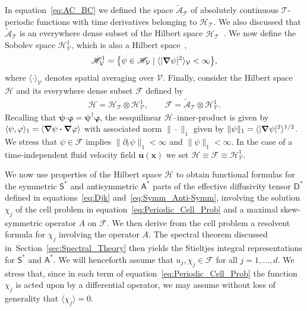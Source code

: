 \documentclass[leqno,onefignum,onetabnum]{siamltex1213}
\newcommand{\secref}[1]{Section~\ref{#1}}
\newcommand{\Tc}{\mathcal{T}}
\newcommand{\Vc}{\mathcal{V}}
\newcommand{\Dm}{\mathsf{D}}
\newcommand{\Sm}{\mathsf{S}}
\newcommand{\Am}{\mathsf{A}}
\newcommand{\Hs}{\mathscr{H}}
\newcommand{\As}{\mathscr{A}}
\newcommand{\Fs}{\mathscr{F}}
\newcommand\bnabla{\mbox{\boldmath${\nabla}$}}
\providecommand\bcdot{\boldsymbol{\cdot}}
\newcommand{\vecx}{\boldsymbol{x}}
\newcommand{\vecu}{\boldsymbol{u}}
\newcommand{\vecpsi}{\boldsymbol{\psi}}
\newcommand{\vecvarphi}{\boldsymbol{\varphi}}
\begin{document}
In equation~\eqref{eq:AC_BC} we defined the space $\tilde{\As}_{\Tc}$ of
absolutely continuous $\Tc$-periodic functions with time derivatives
belonging to $\Hs_{\Tc}$. We also discussed that $\tilde{\As}_{\Tc}$
is an everywhere dense subset of 
the Hilbert space $\Hs_{\Tc}$~\cite{Stone:64}. We now define the Sobolev
space $\Hs^1_{\Vc}$, which is also a Hilbert
space~\cite{Bhattacharya:AAP:1999:951,Folland:95:PDEs,McOwen:2003:PDE},            
% 
\begin{align}\label{eq:Sobolev}
  \Hs^1_{\Vc}=\big\{\psi\in \Hs_{\Vc} \; | \; \langle|\bnabla \psi|^2\rangle_{\Vc}<\infty\big\}, 
\end{align}
%
where $\langle\cdot\rangle_{\Vc}$ 
denotes spatial averaging over $\Vc$.  Finally, consider the Hilbert
space $\Hs$ and its everywhere dense subset $\Fs$ defined by
%
\begin{align}\label{eq:Function_Space_Scalar}
  \Hs=\Hs_{\Tc}\otimes\Hs^1_{\Vc}, \qquad
  \Fs=\tilde{\As}_{\Tc}\otimes\Hs^1_{\Vc}.
\end{align}
%
Recalling that $\vecpsi\bcdot\vecvarphi=\vecpsi^\dagger\vecvarphi$, the sesquilinear
$\Hs$--inner-product is given by $\langle\psi,\varphi\rangle_1=\left\langle\bnabla \psi\bcdot\bnabla \varphi \right\rangle$ with associated norm
$\|\cdot\|_1$ given by $\|\psi\|_1= \langle|\bnabla \psi|^2\rangle^{1/2}$. We stress that $\psi\in\Fs$
implies $\|\partial_t\psi\|_1<\infty$ and $\|\psi\|_1<\infty$. In the case of a time-independent
fluid velocity field $\vecu(\vecx)$ we set $\Hs\equiv\Fs\equiv\Hs^1_{\Vc}$. 





We now use properties of the Hilbert space $\Hs$ to obtain
functional formulas for the symmetric $\Sm^*$ and antisymmetric
$\Am^*$ parts of the effective diffusivity tensor $\Dm^*$ defined in
equations~\eqref{eq:Djk} and~\eqref{eq:Symm_Anti-Symm}, involving the
solution $\chi_j$ of the cell problem in
equation~\eqref{eq:Periodic_Cell_Prob} and a maximal skew-symmetric
operator $A$ on $\Fs$. We then derive from the cell 
problem a resolvent formula for $\chi_j$ involving the operator
$A$. The spectral theorem discussed in~\secref{sec:Spectral_Theory}
then yields the Stieltjes integral representations for
$\Sm^*$ and $\Am^*$. We will henceforth assume that $u_j,\chi_j\in\Fs$ 
for all $j=1,\ldots,d$. We stress that, since
in each term of equation~\eqref{eq:Periodic_Cell_Prob} the function
$\chi_j$ is acted upon by a differential operator, we may assume without
loss of generality that $\langle\chi_j\rangle=0$.
\end{document}
